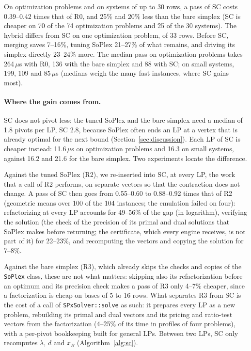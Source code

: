 \documentclass[11pt]{article}
\theoremstyle{definition}
\theoremstyle{remark}
\begin{document}
On optimization problems and on systems of up to 30 rows, a pass of SC costs
0.39--0.42 times that of R0, and 25\% and 20\% less than the bare simplex
(SC is cheaper on 70 of the 74 optimization problems and 25 of the 30
systems). The hybrid differs from SC on one optimization problem, of 33
rows. Before SC, merging saves 7--16\%, tuning SoPlex 21--27\% of what
remains, and driving its simplex directly 23--24\% more. The median pass on optimization
problems takes 264\,$\mu$s with R0, 136 with the bare simplex and 88 with SC;
on small systems, 199, 109 and 85\,$\mu$s (medians weigh the many fast
instances, where SC gains most).

\paragraph{Where the gain comes from.}
SC does not pivot less: the tuned SoPlex and the bare simplex need a median of
1.8 pivots per LP, SC 2.8, because SoPlex often ends an LP at a vertex that is
already optimal for the next bound (Section~\ref{sec:discussion}). Each LP of
SC is cheaper instead: 11.6\,$\mu$s on optimization problems and 16.3 on small
systems, against 16.2 and 21.6 for the bare simplex. Two experiments locate the
difference.

Against the tuned SoPlex (R2), we re-inserted into SC, at every LP, the work
that a call of R2 performs, on separate vectors so that the contraction does
not change. A pass of SC then goes from 0.55--0.60 to 0.88--0.92 times that of
R2 (geometric means over 100 of the 104 instances; the emulation failed on
four): refactorizing at every LP accounts for 49--56\% of the gap (in
logarithm), verifying the solution (the check of the precision of its primal
and dual solutions that SoPlex makes before returning; the certificate, which
every engine receives, is not part of it) for 22--23\%, and recomputing the
vectors and copying the solution for 7--8\%.

Against the bare simplex (R3), which already skips the checks and copies of
the \texttt{SoPlex} class, these are not what matters: skipping also its
refactorization before an optimum and its precision check makes a pass of R3
only 4--7\% cheaper, since a factorization is cheap on bases of 5 to 16 rows.
What separates R3 from SC is the cost of a call of \texttt{SPxSolver::solve}
as such: it
prepares every LP as a new problem, rebuilding its primal and dual vectors and
its pricing and ratio-test vectors from the factorization (4--25\% of its time
in profiles of four problems), with a per-pivot bookkeeping built for general
LPs. Between two LPs, SC only recomputes $\lambda$, $d$ and $x_B$
(Algorithm~\ref{alg:sc}).
\end{document}
